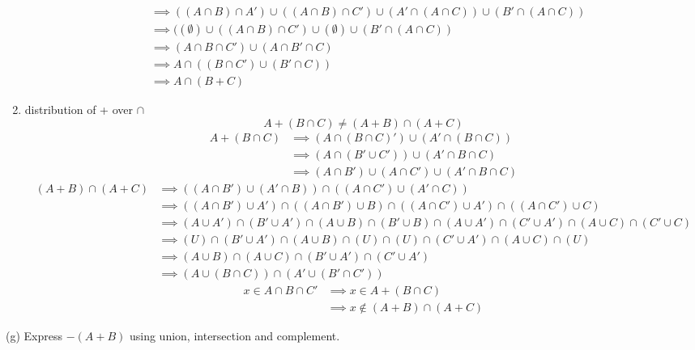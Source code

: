 \documentclass{article}
\begin{document}
\begin{enumerate}
\begin{align*}
        &\implies ((A \cap B) \cap A') \cup ((A \cap B) \cap C') \cup (A'\cap (A \cap C)) \cup (B' \cap (A \cap C))\\
        &\implies ((\emptyset) \cup ((A \cap B) \cap C') \cup (\emptyset) \cup (B' \cap (A \cap C))\\
        &\implies (A \cap B \cap C') \cup (A \cap B' \cap C)\\
        &\implies A \cap ((B \cap C') \cup (B' \cap C))\\
        &\implies  A \cap (B + C)
    \end{align*}
    \item distribution of + over $\cap$
    \begin{equation*}
        A + (B \cap C) \neq (A + B) \cap (A + C)
    \end{equation*}
    \begin{align*}
        A + (B \cap C) &\implies (A \cap (B \cap C)') \cup (A' \cap (B \cap C))\\
        &\implies (A\cap (B' \cup C')) \cup (A' \cap B \cap C)\\
        &\implies (A\cap B') \cup (A\cap C') \cup (A' \cap B \cap C)
    \end{align*}
    \begin{align*}
        (A + B) \cap (A + C) &\implies ((A \cap B')\cup(A'\cap B)) \cap ((A\cap C')\cup(A'\cap C))\\
        &\implies ((A \cap B')\cup A')\cap ((A \cap B')\cup B) \cap ((A\cap C')\cup A')\cap ((A\cap C')\cup C)\\
        &\implies (A \cup A') \cap (B' \cup A')\cap (A\cup B) \cap (B' \cup B) \cap (A \cup A') \cap (C' \cup A')\cap (A\cup C) \cap (C' \cup C)\\
        &\implies (U) \cap (B' \cup A')\cap (A\cup B) \cap (U) \cap (U) \cap (C' \cup A')\cap (A\cup C) \cap (U)\\
        &\implies (A\cup B) \cap (A\cup C) \cap (B' \cup A') \cap (C' \cup A')\\
        &\implies (A \cup (B \cap C)) \cap (A' \cup (B' \cap C'))
    \end{align*}
    \begin{align*}
        x \in A \cap B \cap C' &\implies x \in A+(B \cap C)\\
        &\implies x \notin (A + B) \cap (A + C)
    \end{align*}
\end{enumerate}
(g) Express $-(A+B)$ using union, intersection and complement.
\end{document}
